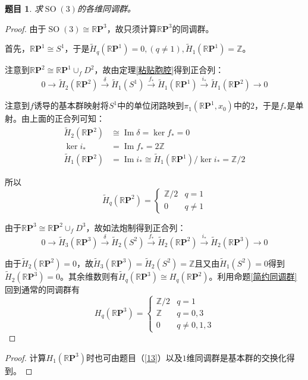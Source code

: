 \documentclass[UTF-8,11pt,fancyhdr,hyperref,titlepage]{ctexart}
\theoremstyle{question}
\newtheorem{timu}{题目}
\theoremstyle{theorem}
\theoremstyle{definition}
\theoremstyle{remark}
\def\ZZ{{\mathbb Z}}
\def\RP{\mathbb{R}\mathbf{P}}
\def\longto{\longrightarrow}
\def\To{\longto}
\newcommand{\markar}[1]{\stackrel{{#1}}{\longrightarrow}}%
\newcommand{\rH}[1]{\widetilde{H}_{#1}}
\DeclareMathOperator{\im}{Im}
\DeclareMathOperator{\SO}{SO}
\begin{document}
\begin{timu}\label{16}
  求$\SO(3)$的各维同调群。
\end{timu}
\begin{proof}
  由于$\SO(3)\cong\RP^3$，故只须计算$\RP^3$的同调群。

  首先，$\RP^1\cong S^1$，于是$\rH{q}(\RP^1)=0,(q\neq1), \rH{1}(\RP^1)=\ZZ$。

  注意到$\RP^2\cong\RP^1\cup_fD^2$，故由定理\ref{粘贴胞腔}得到正合列：
  \begin{equation*}
    0\To \rH{2}(\RP^2)\markar{\delta} \rH{1}(S^1)\markar{f_{\ast}} \rH{1}(\RP^1) \markar{i_{\ast}} \rH{1}(\RP^2)\To 0
  \end{equation*}

  注意到$f$诱导的基本群映射将$S^1$中的单位闭路映到$\pi_1(\RP^1,x_0)$中的$2$，于是$f_{\ast}$是单射。由上面的正合列可知：
  \begin{align*}
    \rH{2}(\RP^2) &\cong\im\delta=\ker f_{\ast}=0 \\
    \ker i_{\ast} &=\im f_{\ast}=2\ZZ \\
    \rH{1}(\RP^2) &=\im i_{\ast} \cong \rH{1}(\RP^1)/\ker i_{\ast} = \ZZ/2
  \end{align*}

  所以
  \begin{equation*}
    \rH{q}(\RP^2)=
    \begin{cases}
      \ZZ/2 & q=1\\
      0 & q\neq1
    \end{cases}
  \end{equation*}

  由于$\RP^3\cong\RP^2\cup_fD^3$，故如法炮制得到正合列：
  \begin{equation*}
    0\To \rH{3}(\RP^3)\markar{\delta} \rH{2}(S^2)\markar{f_{\ast}} \rH{2}(\RP^2) \markar{i_{\ast}} \rH{2}(\RP^3)\To 0
  \end{equation*}

  由于$\rH{2}(\RP^2)=0$，故$\rH{3}(\RP^3)=\rH{2}(S^2)=\ZZ$且又由$\rH{1}(S^2)=0$得到$\rH{2}(\RP^3)=0$。其余维数则有$\rH{q}(\RP^3)\cong H_q(\RP^2)$。利用命题\ref{简约同调群}回到通常的同调群有
  \begin{equation*}
    H_q(\RP^3)=
    \begin{cases}
      \ZZ/2 & q=1\\
      \ZZ & q=0,3\\
      0 & q\neq 0,1,3
    \end{cases}
  \end{equation*}
\end{proof}
\begin{proof}
  计算$H_1(\RP^3)$时也可由题目（\ref{13}）以及$1$维同调群是基本群的交换化得到。
\end{proof}
\end{document}
